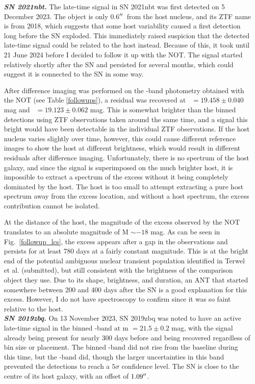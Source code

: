 \documentclass[a4paper,oneside,12pt, class=Latex/Classes/PhDthesisPSnPDF, crop=false]{standalone}
\begin{document}
\textit{\textbf{SN 2021nbt.}}
The late-time signal in SN 2021nbt was first detected on 5 December 2023. The object is only 0.6$^{\prime\prime}$\ from the host nucleus, and its ZTF name is from 2018, which suggests that some host variability caused a first detection long before the SN exploded. This immediately raised suspicion that the detected late-time signal could be related to the host instead. Because of this, it took until 21 June 2024 before I decided to follow it up with the NOT. The signal started relatively shortly after the SN and persisted for several months, which could suggest it is connected to the SN in some way.

After difference imaging was performed on the \ztfr\ztfi-band photometry obtained with the NOT (see Table \ref{followups}), a residual was recovered at \ztfr\ $= 19.458\pm0.040$ mag and \ztfi~$= 19.123\pm0.062$ mag. This is somewhat brighter than the binned detections using ZTF observations taken around the same time, and a signal this bright would have been detectable in the individual ZTF observations. If the host nucleus varies slightly over time, however, this could cause different reference images to show the host at different brightness, which would result in different residuals after difference imaging. Unfortunately, there is no spectrum of the host galaxy, and since the signal is superimposed on the much brighter host, it is impossible to extract a spectrum of the excess without it being completely dominated by the host. The host is too small to attempt extracting a pure host spectrum away from the excess location, and without a host spectrum, the excess contribution cannot be isolated.

At the distance of the host, the magnitude of the excess observed by the NOT translates to an absolute magnitude of M $\sim -18$ mag. As can be seen in Fig.~\ref{followup_lcs}, the excess appears after a gap in the observations and persists for at least 780 days at a fairly constant magnitude. This is at the bright end of the potential ambiguous nuclear transient \citep{2020ohl_Hinkle} population identified in Terwel et al. (submitted), but still consistent with the brightness of the comparison object they use. Due to its shape, brightness, and duration, an ANT that started somewhere between 200 and 400 days after the SN is a good explanation for this excess. However, I do not have spectroscopy to confirm since it was so faint relative to the host.\\


\textit{\textbf{SN 2019zbq.}}
On 13 November 2023, SN 2019zbq was noted to have an active late-time signal in the binned \ztfr-band at m $=21.5\pm0.2$ mag, with the signal already being present for nearly 300 days before and being recovered regardless of bin size or placement. The binned \ztfg-band did not rise from the baseline during this time, but the \ztfi-band did, though the larger uncertainties in this band prevented the detections to reach a $5\sigma$ confidence level. The SN is close to the centre of its host galaxy, with an offset of $1.09^{\prime\prime}$.
\end{document}
